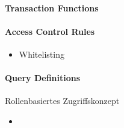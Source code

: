     \paragraph{Transaction Functions}
    
    \paragraph{Access Control Rules}
        \begin{itemize}
            \item Whitelisting
        \end{itemize}
    
    \paragraph{Query Definitions}
    
    Rollenbasiertes Zugriffskonzept
    \begin{itemize}[noitemsep]
        \item 
    \end{itemize}